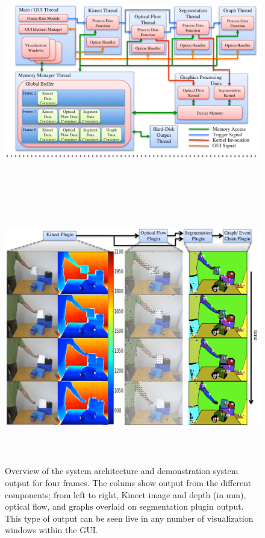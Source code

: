  \begin{figure}
\begin{center}
\includegraphics[width=165mm,height=100mm]{SystemFlowColor.pdf}
\includegraphics[width=170mm,height=112mm]{SystemOutput.pdf}
\end{center}
  \caption{Overview of the system architecture and demonstration system output for four frames. The colums show output from the different components; from left to right, Kinect image and depth (in mm), optical flow, and graphs overlaid on segmentation plugin output. This type of output can be seen live in any number of visualization windows within the GUI.}
\label{fig:SystemArchitecture}
\end{figure}

